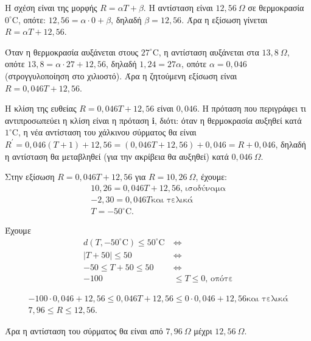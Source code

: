 
\begin{alist}
\item Η σχέση είναι της μορφής $R = \alpha T + \beta$.
Η αντίσταση είναι $12,56 \ \Omega$ σε θερμοκρασία $0^\circ\text{C}$, οπότε: $12,56 = \alpha \cdot 0 + \beta$, δηλαδή $\beta = 12,56$.
Άρα η εξίσωση γίνεται $R = \alpha T + 12,56$.

Όταν η θερμοκρασία αυξάνεται στους $27^\circ\text{C}$, η αντίσταση αυξάνεται στα $13,8 \ \Omega$, οπότε
$13,8 = \alpha \cdot 27 + 12,56$, δηλαδή $1,24 = 27\alpha$, οπότε $\alpha = 0,046$ (στρογγυλοποίηση στο χιλιοστό).
Άρα η ζητούμενη εξίσωση είναι $R = 0,046T + 12,56$.

\item Η κλίση της ευθείας $R = 0,046T + 12,56$ είναι $0,046$.
Η πρόταση που περιγράφει τι αντιπροσωπεύει η κλίση είναι η πρόταση \textbf{i}, διότι:
όταν η θερμοκρασία αυξηθεί κατά $1^\circ\text{C}$, η νέα αντίσταση του χάλκινου σύρματος θα είναι
$R^\prime = 0,046(T + 1) + 12,56 = (0,046T + 12,56) + 0,046 = R + 0,046$, δηλαδή η αντίσταση θα μεταβληθεί (για την ακρίβεια θα αυξηθεί) κατά $0,046 \ \Omega$.

\item
\begin{rlist}
\item Στην εξίσωση $R = 0,046T + 12,56$ για $R = 10,26 \ \Omega$, έχουμε:
\begin{gather*}
10,26 = 0,046T + 12,56\text{, ισοδύναμα} \\
-2,30 = 0,046T\text{και τελικά} \\
T = -50^\circ\text{C}.
\end{gather*}

\item Έχουμε
\begin{align*}
d(T, -50^\circ\text{C}) \le 50^\circ\text{C} \ &\Leftrightarrow \\
|T + 50| \le 50 \ &\Leftrightarrow \\
-50 \le T + 50 \le 50 \ &\Leftrightarrow \\
-100 &\le T \le 0\text{, οπότε}
\end{align*}

\begin{gather*}
-100 \cdot 0,046 + 12,56 \le 0,046T + 12,56 \le 0 \cdot 0,046 + 12,56\text{και τελικά} \\
7,96 \le R \le 12,56.
\end{gather*}

Άρα η αντίσταση του σύρματος θα είναι από $7,96 \ \Omega$ μέχρι $12,56 \ \Omega$.
\end{rlist}
\end{alist}

